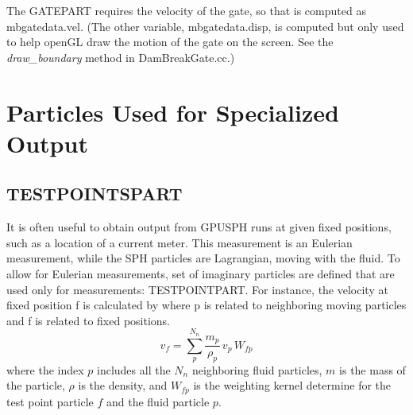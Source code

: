 \documentclass[12pt]{memoir}
\begin{document}
{The GATEPART requires the velocity of the gate, so that is computed as
mbgatedata.vel. (The other variable, mbgatedata.disp, is computed but
only used to help openGL draw the motion of the gate on the screen. See
the {\em draw\_boundary} method in DamBreakGate.cc.)

\section{Particles Used for Specialized Output}
\subsection{TESTPOINTSPART}

It is often useful to obtain output from GPUSPH runs at given fixed
positions, such as a location of a current meter. This measurement is
an Eulerian measurement, while the SPH particles are Lagrangian, moving
with the fluid. To allow for Eulerian measurements, set of imaginary
particles are defined that are used only for measurements:
TESTPOINTPART. For instance, the velocity at fixed position f is
calculated by where p is related to neighboring moving particles and f
is related to fixed positions. 
\begin{equation} 
v_f = \sum_p^{N_n}\frac{m_p}{\rho_p}\, v_p\, W_{fp} 
\end{equation} 
where the index $p$
includes all the $N_n$ neighboring fluid particles, $m$ is the mass of
the particle, $\rho$ is the density, and $W_{fp}$ is the weighting
kernel determine for the test point particle $f$ and the fluid particle
$p$.

}
\end{document}

